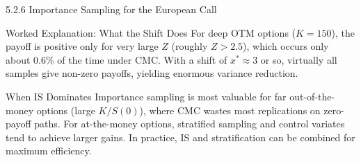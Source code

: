 \documentclass[aspectratio=169,10pt]{beamer}
\begin{document}
\begin{frame}[allowframebreaks]{5.2.6 Importance Sampling for the European Call}
\begin{exampleblock}{Worked Explanation: What the Shift Does}
  For deep OTM options ($K = 150$), the payoff is positive only for very large
  $Z$ (roughly $Z > 2.5$), which occurs only about 0.6\% of the time under CMC.
  With a shift of $x^* \approx 3$ or so, virtually all samples give non-zero
  payoffs, yielding enormous variance reduction.
\end{exampleblock}

\begin{alertblock}{When IS Dominates}
  Importance sampling is most valuable for far out-of-the-money options (large
  $K/S(0)$), where CMC wastes most replications on zero-payoff paths.  For
  at-the-money options, stratified sampling and control variates tend to achieve
  larger gains.  In practice, IS and stratification can be combined for maximum
  efficiency.
\end{alertblock}

\end{frame}
\end{document}

